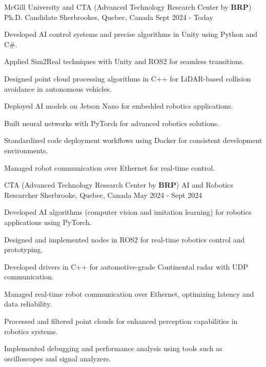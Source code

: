 


\begin{cventries}

\cventry
  { McGill University and CTA (Advanced Technology Research Center by \textbf{BRP})  } 
  {Ph.D. Candidate} 
  {Sherbrookes, Quebec, Canada} %
  {Sept 2024 - Today} %
  {
    \begin{cvitems} %
      \item Developed AI control systems and precise algorithms in Unity using Python and C\#.
      \item Applied Sim2Real techniques with Unity and ROS2 for seamless transitions.
      \item Designed point cloud processing algorithms in C++ for LiDAR-based collision avoidance in autonomous vehicles.
      \item Deployed AI models on Jetson Nano for embedded robotics applications.
      \item Built neural networks with PyTorch for advanced robotics solutions.
      \item Standardized code deployment workflows using Docker for consistent development environments.
      \item Managed robot communication over Ethernet for real-time control.
    \end{cvitems}
  }



\cventry
  { CTA (Advanced Technology Research Center by \textbf{BRP}) } 
  {AI and Robotics Researcher} 
  {Sherbrooke, Quebec, Canada} %
  {May 2024 - Sept 2024} %
  {
    \begin{cvitems} %
      \item Developed AI algorithms (computer vision and imitation learning) for robotics applications using PyTorch.
      \item Designed and implemented nodes in ROS2 for real-time robotics control and prototyping.
      \item Developed drivers in C++ for automotive-grade Continental radar with UDP communication.
      \item Managed real-time robot communication over Ethernet, optimizing latency and data reliability.
      \item Processed and filtered point clouds for enhanced perception capabilities in robotics systems.
      \item Implemented debugging and performance analysis using tools such as oscilloscopes and signal analyzers.
    \end{cvitems}
  }


\end{cventries}
